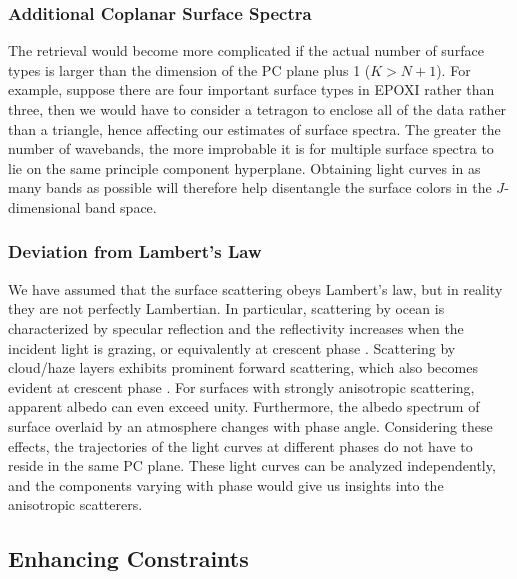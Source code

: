 \documentclass[iop,numberedappendix,apj]{emulateapj}
\begin{document}
\subsubsection{Additional Coplanar Surface Spectra}

The retrieval would become more complicated if the actual number of surface types is larger than the dimension of the PC plane plus 1 ($K > N + 1 $). 
For example, suppose there are four important surface types in EPOXI rather than three, then we would have to consider a tetragon to enclose all of the data rather than a triangle, hence affecting our estimates of surface spectra. 
The greater the number of wavebands, the more improbable it is for multiple surface spectra to lie on the same principle component hyperplane. 
Obtaining light curves in as many bands as possible will therefore help disentangle the surface colors in the $J$-dimensional band space. 


\subsubsection{Deviation from Lambert's Law}
\label{ss:deviate_Lambert}

We have assumed that the surface scattering obeys Lambert's law, but in reality they are not perfectly Lambertian. 
In particular, scattering by ocean is characterized by specular reflection and the reflectivity increases when the incident light is grazing, or equivalently at crescent phase \citep[e.g.,][]{Williams2008,Robinson2010,Robinson2014}. 
Scattering by cloud/haze layers exhibits prominent forward scattering, which also becomes evident at crescent phase \citep[e.g.,]{Robinson2010}. 
For surfaces with strongly anisotropic scattering, apparent albedo can even exceed unity. 
Furthermore, the albedo spectrum of surface overlaid by an atmosphere changes with phase angle.  
Considering these effects, the trajectories of the light curves at different phases do not have to reside in the same PC plane. 
These light curves can be analyzed independently, and the components varying with phase would give us insights into the anisotropic scatterers. 




\subsection{Enhancing Constraints}
\label{ss:enhancing_constraints}
\end{document}
